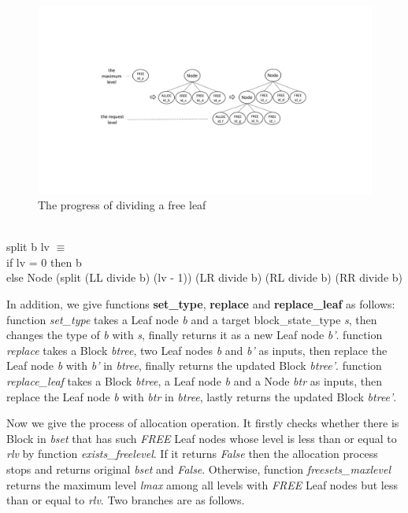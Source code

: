 \begin{figure}
	\centering
	\includegraphics[width=1\textwidth]{fig1.pdf}
	\caption{The progress of dividing a free leaf}
	\label{fig1}
\end{figure}

\begin{definition}  \\
	split b lv $\equiv$ \\
	\phantom{x} \hspace{10pt} if lv = 0 then b \\
	\phantom{x} \hspace{10pt} else Node (split (LL divide b) (lv - 1)) (LR divide b) (RL divide b) (RR divide b)
\end{definition}

In addition, we give functions \textbf{set\_type}, \textbf{replace} and \textbf{replace\_leaf} as follows: function \emph{set\_type} takes a Leaf node \emph{b} and a target block\_state\_type \emph{s}, then changes the type of \emph{b} with \emph{s}, finally returns it as a new Leaf node \emph{b'}. function \emph{replace} takes a Block \emph{btree}, two Leaf nodes \emph{b} and \emph{b'} as inputs, then replace the Leaf node \emph{b} with \emph{b'} in \emph{btree}, finally returns the updated Block \emph{btree'}. function \emph{replace\_leaf} takes a Block \emph{btree}, a Leaf node \emph{b} and a Node \emph{btr} as inputs, then replace the Leaf node \emph{b} with \emph{btr} in \emph{btree}, lastly returns the updated Block \emph{btree'}. 

Now we give the process of allocation operation. It firstly checks whether there is Block in \emph{bset} that has such \emph{FREE} Leaf nodes whose level is less than or equal to \emph{rlv} by function \emph{exists\_freelevel}. If it returns \emph{False} then the allocation process stops and returns original \emph{bset} and \emph{False}. Otherwise, function \emph{freesets\_maxlevel} returns the maximum level \emph{lmax} among all levels with \emph{FREE} Leaf nodes but less than or equal to \emph{rlv}. Two branches are as follows.

